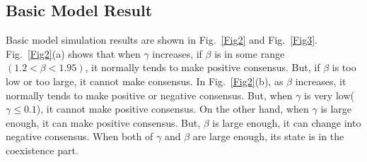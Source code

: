 \documentclass[english]{cccconf}
\begin{document}
\subsection{Basic Model Result}
Basic model simulation results are shown in Fig.~\ref{Fig2} and Fig.~\ref{Fig3}. Fig.~\ref{Fig2}(a) shows that when $\gamma$ increases, if $\beta$ is in some range$(1.2 < \beta < 1.95)$, it normally tends to make positive consensus. But, if $\beta$ is too low or too large, it cannot make consensus.
In Fig.~\ref{Fig2}(b), as $\beta$ increases, it normally tends to make positive or negative consensus. But, when $\gamma$ is very low($\gamma \le 0.1$), it cannot make positive consensus. On the other hand, when $\gamma$ is large enough, it can make positive consensus. But, $\beta$ is large enough, it can change into negative consensus. When both of $\gamma$ and $\beta$ are large enough, its state is in the coexistence part. 
\end{document}
